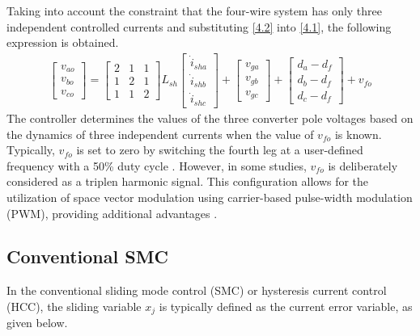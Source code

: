 Taking into account the constraint that the four-wire system has only three independent controlled currents and substituting \eqref{4.2} into \eqref{4.1}, the following expression is obtained.
\begin{equation} \label{4.3(1)}
	\begin{aligned}
			\begin{bmatrix}
			v_{ao}\\
			v_{bo}\\
			v_{co}
			\end{bmatrix}
			= 
			\begin{bmatrix}
			2  & 1       & 1 \\
			1  & 2       & 1 \\
			1  & 1       & 2
			\end{bmatrix}
			L_{sh}
			\begin{bmatrix}
			\dot{i}_{sha}\\
			\dot{i}_{shb}\\
			\dot{i}_{shc}
			\end{bmatrix}
			+
			\begin{bmatrix}
			v_{ga}\\
			v_{gb}\\
			v_{gc}
			\end{bmatrix}
			+
			\begin{bmatrix}
			d_{a}-d_{f}\\
			d_{b}-d_{f}\\
			d_{c}-d_{f}
			\end{bmatrix}
			+
			v_{fo}
	\end{aligned}
\end{equation} 
The controller determines the values of the three converter pole voltages based on the dynamics of three independent currents when the value of $v_{fo}$ is known. Typically, $v_{fo}$ is set to zero by switching the fourth leg at a user-defined frequency with a 50\% duty cycle \cite{5224000}. However, in some studies, $v_{fo}$ is deliberately considered as a triplen harmonic signal. This configuration allows for the utilization of space vector modulation using carrier-based pulse-width modulation (PWM), providing additional advantages \cite{1262054}. 
\vspace*{-1cm}\subsection{Conventional SMC}
In the conventional sliding mode control (SMC) or hysteresis current control (HCC), the sliding variable $x_j$ is typically defined as the current error variable, as given below. 
